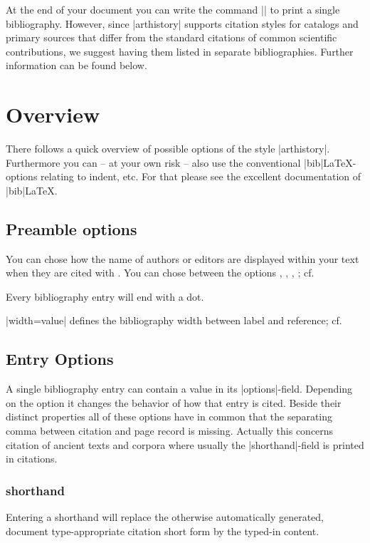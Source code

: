 \documentclass[a4paper,
10pt,
ngerman,
english
]{ltxdoc}
\begin{document}
At the end of your document you can write the command |\printbibliography| to print 
a single bibliography.
However, since |arthistory| supports citation styles for catalogs and primary sources that differ from the standard citations of common scientific contributions, we suggest having them listed in separate bibliographies. 
Further information can be found below. %

\section{Overview}\label{overview}
There follows a quick overview of possible options of the style |arthistory|. 
Furthermore you can -- at your own risk -- also use the conventional |bib|\LaTeX-options relating to indent, etc. 
For that please see the excellent documentation of  |bib|\LaTeX.

\subsection{Preamble options}\label{preamble_options}

You can chose how the name of authors or editors are displayed within your text when they are cited with .
You can chose between the options , , , ; 
cf. %

Every bibliography entry will end with a dot.

|width={value}| defines the bibliography width between label and reference; cf. %

\subsection{Entry Options}
A single bibliography entry can contain a value in its |options|-field.
Depending on the option it changes the behavior of how that entry is cited.
Beside their distinct properties all of these options have in common that the separating comma between citation and page record is missing. 
Actually this concerns citation of ancient texts and corpora where usually the |shorthand|-field is printed in citations.

\subsubsection{shorthand}\label{sec:shorthand}
Entering a shorthand will replace the otherwise automatically generated, document type-appropriate citation short form by the typed-in content.
\end{document}
